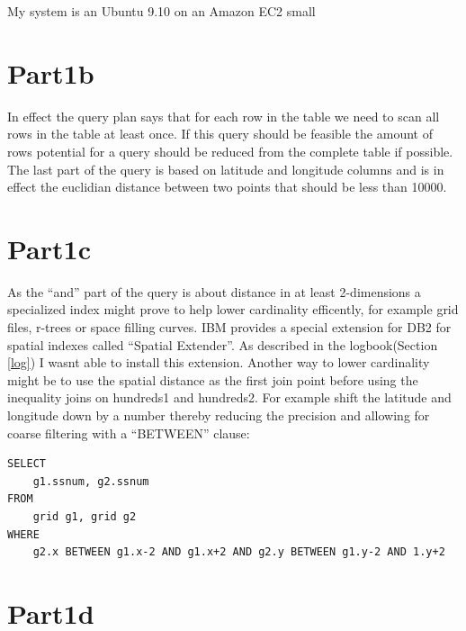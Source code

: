 My system is an Ubuntu 9.10 on an Amazon EC2 small
\section{Part1b}
In effect the query plan says that for each row in the table we need to scan all
rows in the table at least once. If this query should be feasible the amount of
rows potential for a query should be reduced from the complete table if
possible. The last part of the query is based on latitude and longitude columns
and is in effect the euclidian distance between two points that should be less
than 10000.

\section{Part1c}
As the ``and'' part of the query is about distance in at least 2-dimensions a
specialized index might prove to help lower cardinality efficently, for example
grid files, r-trees or space filling curves. IBM provides a special extension
for DB2 for spatial indexes called ``Spatial Extender''. As described in the
logbook(Section \ref{log}) I wasnt able to install this extension. Another way
to lower cardinality might be to use the spatial distance as the first join
point before using the inequality joins on hundreds1 and hundreds2. 
For example shift the latitude and longitude down by a number thereby reducing
the precision and allowing for coarse filtering  with a ``BETWEEN'' clause:
\begin{verbatim}
SELECT
    g1.ssnum, g2.ssnum
FROM
    grid g1, grid g2
WHERE
    g2.x BETWEEN g1.x-2 AND g1.x+2 AND g2.y BETWEEN g1.y-2 AND 1.y+2 
\end{verbatim}

\section{Part1d}

